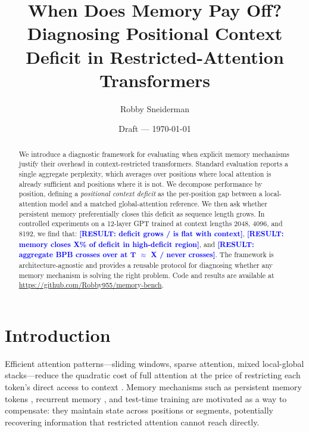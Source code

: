 \documentclass[11pt]{article}
\title{%
  When Does Memory Pay Off?\\
  Diagnosing Positional Context Deficit in Restricted-Attention Transformers%
}
\author{Robby Sneiderman}
\date{Draft --- \today}
\newcommand{\result}[1]{\textcolor{blue}{\textbf{[RESULT: #1]}}}
\begin{document}
\maketitle

\begin{abstract}
We introduce a diagnostic framework for evaluating when explicit memory
mechanisms justify their overhead in context-restricted transformers.
Standard evaluation reports a single aggregate perplexity, which averages
over positions where local attention is already sufficient and positions
where it is not. We decompose performance by position, defining a
\emph{positional context deficit} as the per-position gap between a
local-attention model and a matched global-attention reference. We then
ask whether persistent memory preferentially closes this deficit as
sequence length grows. In controlled experiments on a 12-layer GPT
trained at context lengths 2048, 4096, and 8192, we find that:
\result{deficit grows / is flat with context},
\result{memory closes X\% of deficit in high-deficit region},
and \result{aggregate BPB crosses over at T $\approx$ X / never crosses}.
The framework is architecture-agnostic and provides a reusable protocol
for diagnosing whether any memory mechanism is solving the right problem.
Code and results are available at
\url{https://github.com/Robby955/memory-bench}.
\end{abstract}


\section{Introduction}
\label{sec:intro}

Efficient attention patterns---sliding windows, sparse attention,
mixed local-global stacks---reduce the quadratic cost of full attention
at the price of restricting each token's direct access to context
\citep{jiang2023mistral, beltagy2020longformer, zaheer2020bigbird}.
Memory mechanisms such as persistent memory tokens
\citep{sukhbaatar2019persistent}, recurrent memory
\citep{bulatov2022rmt}, and test-time training
\citep{sun2024ttt} are motivated as a way to compensate: they
maintain state across positions or segments, potentially recovering
information that restricted attention cannot reach directly.
\end{document}
